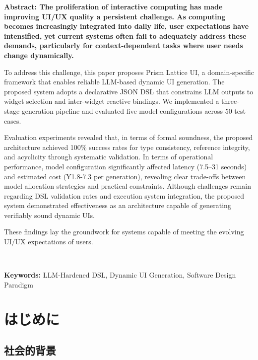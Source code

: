 \documentclass[a4paper,10pt]{jarticle}
\begin{document}
\normalsize{
\bf{Abstract:}
The proliferation of interactive computing has made improving UI/UX quality a persistent challenge. As computing becomes increasingly integrated into daily life, user expectations have intensified, yet current systems often fail to adequately address these demands, particularly for context-dependent tasks where user needs change dynamically.

To address this challenge, this paper proposes Prism Lattice UI, a domain-specific framework that enables reliable LLM-based dynamic UI generation. The proposed system adopts a declarative JSON DSL that constrains LLM outputs to widget selection and inter-widget reactive bindings. We implemented a three-stage generation pipeline and evaluated five model configurations across 50 test cases.

Evaluation experiments revealed that, in terms of formal soundness, the proposed architecture achieved 100\% success rates for type consistency, reference integrity, and acyclicity through systematic validation. In terms of operational performance, model configuration significantly affected latency (7.5–31 seconds) and estimated cost (¥1.8-7.3 per generation), revealing clear trade-offs between model allocation strategies and practical constraints. Although challenges remain regarding DSL validation rates and execution system integration, the proposed system demonstrated effectiveness as an architecture capable of generating verifiably sound dynamic UIs.

These findings lay the groundwork for systems capable of meeting the evolving UI/UX expectations of users.
}
\\
\vspace{-7mm}
\begin{center}
\normalsize{\bf{Keywords:}} LLM-Hardened DSL, Dynamic UI Generation, Software Design Paradigm
\end{center}

\thispagestyle{empty}


\newpage


\section{はじめに}
\label{sec:introduction}

\subsection{社会的背景}
\end{document}
